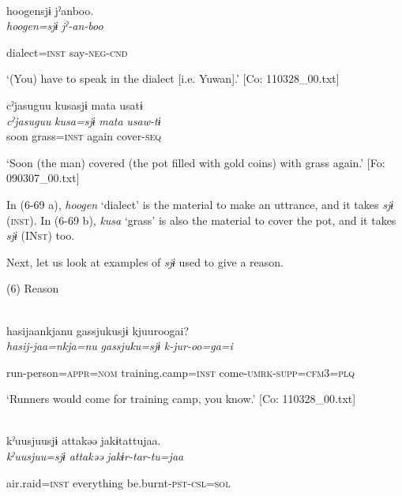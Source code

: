  \ea{}\\
\gll  {\TM}  {\textbar}hoogen{\textbar}sjɨ  jˀanboo.\\

      \textit{hoogen=sjɨ}  \textit{jˀ-an-boo}

      dialect=\textsc{inst}  say-\textsc{neg}-\textsc{cnd}

\glt ‘(You) have to speak in the dialect [i.e. Yuwan].’ [Co: 110328\_00.txt]
\z

 \ex {\TM}  cˀjasuguu  kusasjɨ  mata  usatɨ\\
\gll \textit{cˀjasuguu}  \textit{kusa=sjɨ}  \textit{mata}  \textit{usaw-tɨ}\\

      soon  grass=\textsc{inst}  again  cover-\textsc{seq}

\glt ‘Soon (the man) covered (the pot filled with gold coins) with grass again.’ [Fo: 090307\_00.txt]
\z

In (6-69 a), \textit{hoogen} ‘dialect’ is the material to make an uttrance, and it takes \textit{sjɨ} (\textsc{inst}). In (6-69 b), \textit{kusa} ‘grass’ is also the material to cover the pot, and it takes \textit{sjɨ} (IN\textsc{st}) too.

Next, let us look at examples of \textit{sjɨ} used to give a reason.

(6)  Reason

 \ea{}\\
\gll  {\TM}  hasijaankjanu  {\textbar}gassjuku{\textbar}sjɨ  kjuuroogai?\\

      \textit{hasij-jaa=nkja=nu}  \textit{gassjuku=sjɨ}  \textit{k-jur-oo=ga=i}

      run-person=\textsc{appr}=\textsc{nom}  training.camp=\textsc{inst}  come-\textsc{umrk}-\textsc{supp}=\textsc{cfm}3=\textsc{plq}

\glt ‘Runners would come for training camp, you know.’ [Co: 110328\_00.txt]
\z

 \ex{}\\
{\TM}
\gll  kˀuusjuusjɨ  attakəə  jakɨtattujaa.\\

      \textit{kˀuusjuu=sjɨ}  \textit{attakəə}  \textit{jakɨr-tar-tu=jaa}

      air.raid=\textsc{inst}  everything  be.burnt-\textsc{pst}-\textsc{csl}=\textsc{sol}


